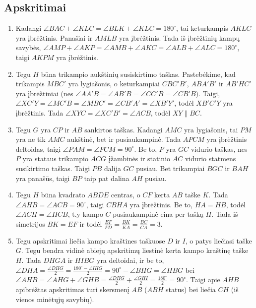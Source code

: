 \subsection*{Apskritimai}
\begin{enumerate}
\item
  Kadangi $\angle BAC + \angle KLC = \angle BLK + \angle
  KLC = 180^\circ$, tai keturkampis $AKLC$ yra įbrėžtinis.
  Panašiai ir $AMLB$ yra įbrėžtinis. Tada iš įbrėžtinių
  kampų savybės, $\angle AMP + \angle AKP = \angle AMB +
  \angle AKC = \angle ALB + \angle ALC = 180^\circ$, taigi
  $AKPM$ yra įbrėžtinis.   
\item
  Tegu $H$ būna trikampio aukštinių susiskirtimo taškas.
  Pastebėkime, kad trikampis $MBC'$ yra lygiašonis, o
  keturkampiai $CBC'B'$, $ABA'B'$ ir $AB'HC'$ yra
  įbrėžtiniai (nes $\angle AA'B = \angle AB'B = \angle CC'B
  = \angle CB'B$).  Taigi, $\angle XC'Y = \angle MC'B =
  \angle MBC' = \angle CB'A' = \angle XB'Y'$, todėl
  $XB'C'Y$ yra įbrėžtinis. Tada $\angle XYC = \angle XC'B'
  = \angle ACB$, todėl $XY\parallel{BC}$.
\item
  Tegu $G$ yra $CP$ ir $AB$ sankirtos taškas. Kadangi $AMC$
  yra lygiašonis, tai $PM$ yra ne tik $AMC$ aukštinė, bet
  ir pusiaukampinė. Tada $APCM$ yra įbrėžtinis deltoidas,
  taigi $\angle PAM = \angle PCM = 90^\circ$. Be to, $P$
  yra $GC$ vidurio taškas, nes $P$ yra stataus trikampio
  $ACG$ įžambinės ir statinio $AC$ vidurio statmens
  susikirtimo taškas. Taigi $PB$ dalija $GC$ pusiau. Bet
  trikampiai $BGC$ ir $BAH$ yra panašūs, taigi $BP$ taip
  pat dalina $AH$ pusiau. 
\item
  Tegu $H$ būna kvadrato $ABDE$ centras, o $CF$ kerta $AB$
  taške $K$. Tada $\angle AHB = \angle ACB = 90^\circ$,
  taigi $CBHA$ yra įbrėžtinis. Be to, $HA = HB$, todėl
  $\angle ACH = \angle HCB$, t.y kampo $C$ pusiaukampinė
  eina per tašką $H$. Tada iš simetrijos $BK = EF$ ir todėl
  $\frac{EF}{FD} = \frac{BK}{KA} = \frac{BC}{CA} = 3$.
\item
  Tegu apskritimai liečia kampo kraštines taškuose $D$ ir
  $I$, o patys liečiasi taške $G$. Tegu bendra vidinė
  abiejų apskritimų liestinė kerta kampo kraštinę taške
  $H$. Tada $DHGA$ ir $HIBG$ yra deltoidai, ir be to,
  $\angle DHA = \frac{\angle DHG}{2} =
  \frac{180^\circ-\angle IHG}{2} = 90^\circ - \angle BHG =
  \angle HBG$ bei $\angle AHB = \angle AHG + \angle GHB =
  \frac{\angle DHG}{2} + \frac{\angle GHI}{2} =
  \frac{180^\circ}{2} = 90^\circ$. Taigi apie $AHB$
  apibrėžtas apskritimas turi skersmenį $AB$ ($ABH$ status)
  bei liečia $CH$ (iš vienos minėtųjų savybių).

\end{enumerate}
